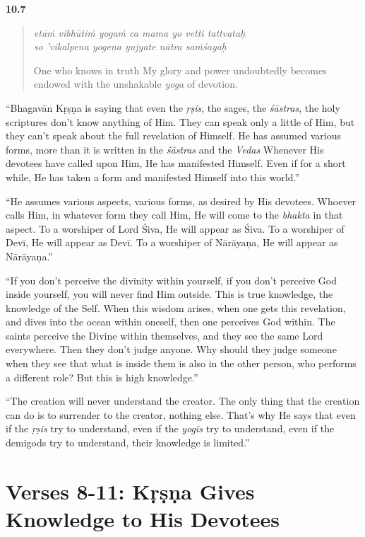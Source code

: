 \par\noindent\textbf{10.7}\par
\begin{verse}
\textit{etāṁ vibhūtiṁ yogaṁ ca mama yo vetti tattvataḥ} \\
\textit{so ’vikalpena yogena yujyate nātra saṁśayaḥ}

\noindent One who knows in truth My glory and power undoubtedly becomes endowed with the unshakable \textit{yoga} of devotion.
\end{verse}
\par


\enquote{Bhagavān Kṛṣṇa is saying that even the \textit{ṛṣis}, the sages, the \textit{śāstras}, the holy scriptures don’t know anything of Him. They can speak only a little of Him, but they can’t speak about the full revelation of Himself. He has assumed various forms, more than it is written in the \textit{śāstras} and the \textit{Vedas} Whenever His devotees have called upon Him, He has manifested Himself. Even if for a short while, He has taken a form and manifested Himself into this world.}

\enquote{He assumes various aspects, various forms, as desired by His devotees. Whoever calls Him, in whatever form they call Him, He will come to the \textit{bhakta} in that aspect. To a worshiper of Lord Śiva, He will appear as Śiva. To a worshiper of Devī, He will appear as Devī. To a worshiper of Nārāyaṇa, He will appear as Nārāyaṇa.}

\enquote{If you don’t perceive the divinity within yourself, if you don’t perceive God inside yourself, you will never find Him outside. This is true knowledge, the knowledge of the Self. When this wisdom arises, when one gets this revelation, and dives into the ocean within oneself, then one perceives God within. The saints perceive the Divine within themselves, and they see the same Lord everywhere. Then they don’t judge anyone. Why should they judge someone when they see that what is inside them is also in the other person, who performs a different role? But this is high knowledge.}

\enquote{The creation will never understand the creator. The only thing that the creation can do is to surrender to the creator, nothing else. That’s why He says that even if the \textit{ṛṣis} try to understand, even if the \textit{yogīs} try to understand, even if the demigods try to understand, their knowledge is limited.}

\newpage
\section{Verses 8-11: Kṛṣṇa Gives Knowledge to His Devotees}\label{sec-verses-8-11-krsna-gives-knowledge-to-his-devotees}


